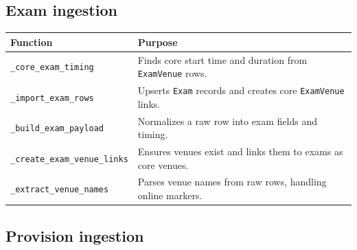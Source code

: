 \subsection{Exam ingestion}
\label{subsec:uploadprocessor:exam}

\begin{longtable}{p{}p{}}
\toprule
\textbf{Function} & \textbf{Purpose} \\
\midrule
\texttt{\_core\_exam\_timing} & Finds core start time and duration from \texttt{ExamVenue} rows. \\
\texttt{\_import\_exam\_rows} & Upserts \texttt{Exam} records and creates core \texttt{ExamVenue} links. \\
\texttt{\_build\_exam\_payload} & Normalizes a raw row into exam fields and timing. \\
\texttt{\_create\_exam\_venue\_links} & Ensures venues exist and links them to exams as core venues. \\
\texttt{\_extract\_venue\_names} & Parses venue names from raw rows, handling online markers. \\
\bottomrule
\end{longtable}

\subsection{Provision ingestion}
\label{subsec:uploadprocessor:provisions}


